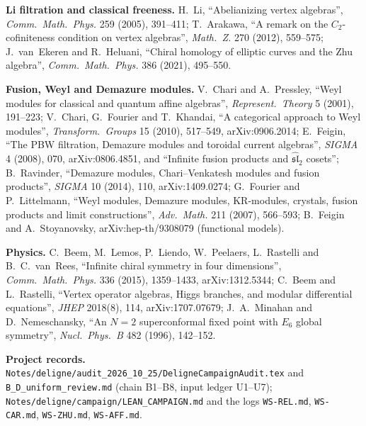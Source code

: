 \textbf{Li filtration and classical freeness.} H.~Li, ``Abelianizing vertex algebras'', \emph{Comm.\ Math.\ Phys.} 259 (2005),
391--411; T.~Arakawa, ``A remark on the $C_2$-cofiniteness condition on vertex algebras'', \emph{Math.\ Z.} 270 (2012),
559--575; J.~van~Ekeren and R.~Heluani, ``Chiral homology of elliptic curves and the Zhu algebra'', \emph{Comm.\ Math.\ Phys.}
386 (2021), 495--550.

\textbf{Fusion, Weyl and Demazure modules.} V.~Chari and A.~Pressley, ``Weyl modules for classical and quantum affine
algebras'', \emph{Represent.\ Theory} 5 (2001), 191--223; V.~Chari, G.~Fourier and T.~Khandai, ``A categorical approach to Weyl
modules'', \emph{Transform.\ Groups} 15 (2010), 517--549, arXiv:0906.2014; E.~Feigin, ``The PBW filtration, Demazure modules and
toroidal current algebras'', \emph{SIGMA} 4 (2008), 070, arXiv:0806.4851, and ``Infinite fusion products and
$\widehat{\mathfrak{sl}}_2$ cosets''; B.~Ravinder, ``Demazure modules, Chari--Venkatesh modules and fusion products'', \emph{SIGMA} 10 (2014), 110, arXiv:1409.0274; G.~Fourier and
P.~Littelmann, ``Weyl modules, Demazure modules, KR-modules, crystals, fusion products and limit constructions'',
\emph{Adv.\ Math.} 211 (2007), 566--593; B.~Feigin and A.~Stoyanovsky, arXiv:hep-th/9308079 (functional models).

\textbf{Physics.} C.~Beem, M.~Lemos, P.~Liendo, W.~Peelaers, L.~Rastelli and B.~C.~van~Rees, ``Infinite chiral symmetry in four
dimensions'', \emph{Comm.\ Math.\ Phys.} 336 (2015), 1359--1433, arXiv:1312.5344; C.~Beem and L.~Rastelli, ``Vertex operator
algebras, Higgs branches, and modular differential equations'', \emph{JHEP} 2018(8), 114, arXiv:1707.07679; J.~A.~Minahan and
D.~Nemeschansky, ``An $N=2$ superconformal fixed point with $E_6$ global symmetry'', \emph{Nucl.\ Phys.\ B} 482 (1996), 142--152.

\textbf{Project records.} \texttt{Notes/deligne/audit\_2026\_10\_25/DeligneCampaignAudit.tex} and
\texttt{B\_D\_uniform\_review.md} (chain B1--B8, input ledger U1--U7); \texttt{Notes/deligne/campaign/LEAN\_CAMPAIGN.md} and the
logs \texttt{WS-REL.md}, \texttt{WS-CAR.md}, \texttt{WS-ZHU.md}, \texttt{WS-AFF.md}.

\endgroup
